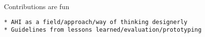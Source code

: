 Contributions are fun

\begin{verbatim}
* AHI as a field/approach/way of thinking designerly
* Guidelines from lessons learned/evaluation/prototyping
\end{verbatim}